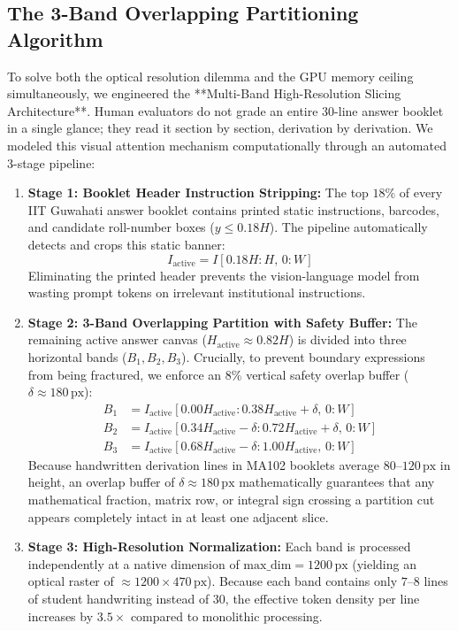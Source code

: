 \subsection{The 3-Band Overlapping Partitioning Algorithm}
To solve both the optical resolution dilemma and the GPU memory ceiling simultaneously, we engineered the **Multi-Band High-Resolution Slicing Architecture**. Human evaluators do not grade an entire 30-line answer booklet in a single glance; they read it section by section, derivation by derivation. We modeled this visual attention mechanism computationally through an automated 3-stage pipeline:

\begin{enumerate}
    \item \textbf{Stage 1: Booklet Header Instruction Stripping:} The top $18\%$ of every IIT Guwahati answer booklet contains printed static instructions, barcodes, and candidate roll-number boxes ($y \le 0.18H$). The pipeline automatically detects and crops this static banner:
    \begin{equation}
    I_{\text{active}} = I\left[0.18H : H,\, 0 : W\right]
    \end{equation}
    Eliminating the printed header prevents the vision-language model from wasting prompt tokens on irrelevant institutional instructions.
    
    \item \textbf{Stage 2: 3-Band Overlapping Partition with Safety Buffer:} The remaining active answer canvas ($H_{\text{active}} \approx 0.82H$) is divided into three horizontal bands ($B_1, B_2, B_3$). Crucially, to prevent boundary expressions from being fractured, we enforce an $8\%$ vertical safety overlap buffer ($\delta \approx 180\,\text{px}$):
    \begin{align}
    B_1 &= I_{\text{active}}\left[0.00H_{\text{active}} : 0.38H_{\text{active}} + \delta,\, 0 : W\right] \\
    B_2 &= I_{\text{active}}\left[0.34H_{\text{active}} - \delta : 0.72H_{\text{active}} + \delta,\, 0 : W\right] \\
    B_3 &= I_{\text{active}}\left[0.68H_{\text{active}} - \delta : 1.00H_{\text{active}},\, 0 : W\right]
    \end{align}
    Because handwritten derivation lines in MA102 booklets average $80$--$120\,\text{px}$ in height, an overlap buffer of $\delta \approx 180\,\text{px}$ mathematically guarantees that any mathematical fraction, matrix row, or integral sign crossing a partition cut appears completely intact in at least one adjacent slice.
    
    \item \textbf{Stage 3: High-Resolution Normalization:} Each band is processed independently at a native dimension of $\text{max\_dim} = 1200\,\text{px}$ (yielding an optical raster of $\approx 1200 \times 470\,\text{px}$). Because each band contains only $7$--$8$ lines of student handwriting instead of 30, the effective token density per line increases by $3.5\times$ compared to monolithic processing.
\end{enumerate}

